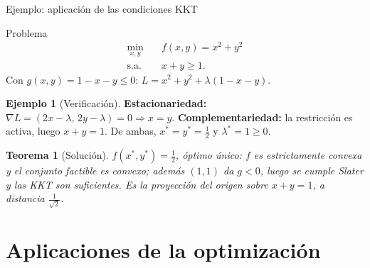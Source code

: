 \documentclass[10pt,aspectratio=169]{beamer}
\theoremstyle{definition}
\newtheorem{ejemplo}{Ejemplo}
\theoremstyle{plain}
\newtheorem{teorema}{Teorema}
\begin{document}
\begin{frame}[t]{Ejemplo: aplicación de las condiciones KKT}
  \begin{block}{Problema}
    \begin{align*}
      \min_{x,y}\quad & f(x,y)=x^{2}+y^{2}\\
      \text{s.a.}\quad & x+y\geq 1 .
    \end{align*}
    Con $g(x,y)=1-x-y\leq 0$: $L=x^{2}+y^{2}+\lambda(1-x-y)$.
  \end{block}

  \begin{ejemplo}[Verificación]
    \textbf{Estacionariedad:}
    $\nabla L=(2x-\lambda,\,2y-\lambda)=0\Rightarrow x=y$.
    \textbf{Complementariedad:} la restricción es activa, luego
    $x+y=1$. De ambas, $x^{*}=y^{*}=\tfrac{1}{2}$ y
    $\lambda^{*}=1\geq 0$.
  \end{ejemplo}

  \begin{teorema}[Solución]
    $f(x^{*},y^{*})=\tfrac{1}{2}$, óptimo \emph{único}: $f$ es
    estrictamente convexa y el conjunto factible es convexo; además
    $(1,1)$ da $g<0$, luego se cumple \emph{Slater} y las KKT son
    \emph{suficientes}. Es la proyección del origen sobre $x+y=1$,
    a distancia $\tfrac{1}{\sqrt{2}}$.
  \end{teorema}
\end{frame}

\section{Aplicaciones de la optimización}
\end{document}

